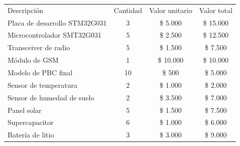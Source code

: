 \documentclass[
11pt, %
codirector, %
]{charter}
\begin{document}
\begin{table}[htpb]
\centering
\begin{tabularx}{\linewidth}{@{}|X|c|r|r|@{}}
\hline
\rowcolor[HTML]{C0C0C0} 
\multicolumn{4}{|c|}{\cellcolor[HTML]{C0C0C0}COSTOS DIRECTOS} \\ \hline
\rowcolor[HTML]{C0C0C0} 
Descripción &
  \multicolumn{1}{c|}{\cellcolor[HTML]{C0C0C0}Cantidad} &
  \multicolumn{1}{c|}{\cellcolor[HTML]{C0C0C0}Valor unitario} &
  \multicolumn{1}{c|}{\cellcolor[HTML]{C0C0C0}Valor total} \\ \hline
  
Placa de desarrollo STM32G031 &
  \multicolumn{1}{c|}{3} &
  \multicolumn{1}{c|}{\$ 5.000} &
  \multicolumn{1}{c|}{\$ 15.000} \\ \hline
  
Microcontrolador SMT32G031 &
  \multicolumn{1}{c|}{5} &
  \multicolumn{1}{c|}{\$ 2.500} &
  \multicolumn{1}{c|}{\$ 12.500} \\ \hline
  
Transceiver de radio &
  \multicolumn{1}{c|}{5} &
  \multicolumn{1}{c|}{\$ 1.500} &
  \multicolumn{1}{c|}{\$ 7.500} \\ \hline
  
Módulo de GSM &
  \multicolumn{1}{c|}{1} &
  \multicolumn{1}{c|}{\$ 10.000} &
  \multicolumn{1}{c|}{\$ 10.000} \\ \hline
  
Modelo de PBC final &
  \multicolumn{1}{c|}{10} &
  \multicolumn{1}{c|}{\$ 500} &
  \multicolumn{1}{c|}{\$ 5.000} \\ \hline
  
Sensor de temperatura &
  \multicolumn{1}{c|}{2} &
  \multicolumn{1}{c|}{\$ 1.000} &
  \multicolumn{1}{c|}{\$ 2.000} \\ \hline
  
Sensor de humedad de suelo &
  \multicolumn{1}{c|}{2} &
  \multicolumn{1}{c|}{\$ 3.500} &
  \multicolumn{1}{c|}{\$ 7.000} \\ \hline
  
Panel solar &
  \multicolumn{1}{c|}{5} &
  \multicolumn{1}{c|}{\$ 1.500} &
  \multicolumn{1}{c|}{\$ 7.500} \\ \hline
  
Supercapacitor &
  \multicolumn{1}{c|}{6} &
  \multicolumn{1}{c|}{\$ 1.000} &
  \multicolumn{1}{c|}{\$ 6.000} \\ \hline
  
Batería de litio &
  \multicolumn{1}{c|}{3} &
  \multicolumn{1}{c|}{\$ 3.000} &
  \multicolumn{1}{c|}{\$ 9.000} \\ \hline
  

\end{tabularx}
\end{table}
\end{document}
